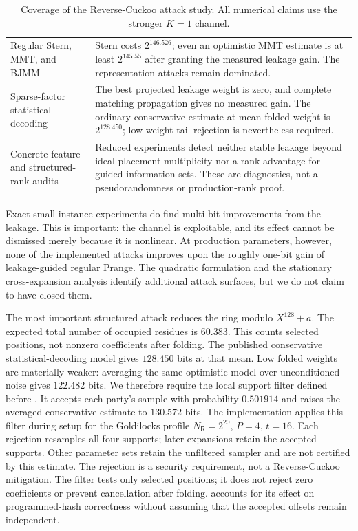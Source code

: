 \begin{table}[t]
\begin{tabular}{p{}|p{}}
Regular Stern, MMT, and BJMM
& Stern costs $2^{146.526}$; even an optimistic MMT estimate is at least
  $2^{145.55}$ after granting the measured leakage gain.  The representation
  attacks remain dominated. \\

Sparse-factor statistical decoding
& The best projected leakage weight is zero, and complete matching propagation
  gives no measured gain.  The ordinary conservative estimate at mean folded
  weight is $2^{128.450}$; low-weight-tail rejection is nevertheless required. \\

Concrete feature and structured-rank audits
& Reduced experiments detect neither stable leakage beyond ideal placement
  multiplicity nor a rank advantage for guided information sets.  These are
  diagnostics, not a pseudorandomness or production-rank proof. \\
\bottomrule
\end{tabular}
\caption{Coverage of the Reverse-Cuckoo attack study.  All numerical claims
use the stronger $K=1$ channel.}
\label{tab:revCuckooAttackCoverage}
\end{table}

Exact small-instance experiments do find multi-bit improvements from the
leakage.  This is important: the channel is exploitable, and its effect cannot
be dismissed merely because it is nonlinear.  At production parameters,
however, none of the implemented attacks improves upon the roughly one-bit
gain of leakage-guided regular Prange.  The quadratic formulation and the
stationary cross-expansion analysis identify additional attack surfaces, but
we do not claim to have closed them.

The most important structured attack reduces the ring modulo
$X^{128}+a$.  The expected total number of occupied residues is $60.383$.
This counts selected positions, not nonzero coefficients after folding. The
published conservative statistical-decoding model gives $128.450$ bits at
that mean.  Low folded weights are materially weaker: averaging the same
optimistic model over unconditioned noise gives $122.482$ bits.  We therefore
require the local support filter defined before
.  It accepts each party's sample with
probability $0.501914$ and raises the averaged conservative estimate to
$130.572$ bits. The implementation applies this filter during setup for
the Goldilocks profile $N_{\mathsf R}=2^{20}$, $P=4$, $t=16$.
Each rejection resamples all four supports; later expansions retain the
accepted supports. Other parameter sets retain the unfiltered sampler and
are not certified by this estimate. The rejection is a security requirement,
not a Reverse-Cuckoo mitigation.
The filter tests only selected positions; it does not reject zero
coefficients or prevent cancellation after folding.
 accounts for its effect on programmed-hash
correctness without assuming that the accepted offsets remain independent.

